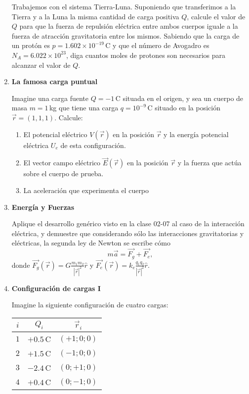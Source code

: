 \documentclass[a4paper,12pt]{article}
\begin{document}
\begin{enumerate}
Trabajemos con el sistema Tierra-Luna. Suponiendo
que transferimos a la Tierra y a la Luna la misma cantidad de carga positiva $Q$,
calcule el valor de $Q$ para que la fuerza de repulsión eléctrica entre ambos
cuerpos iguale a la fuerza de atracción gravitatoria entre los mismos. Sabiendo
que la carga de un protón es $p=1.602\times10^{-19}$\,C y que el número de
Avogadro es $N_A=6.022\times
10^{23}$, diga cuantos moles de protones son necesarios para alcanzar el
valor de $Q$.

\item {\bf{La famosa carga puntual}}

Imagine una carga fuente $Q=-1$\,C situada en el origen, y sea un cuerpo de
masa $m=1$\,kg que tiene una carga $q=10^{-9}$\,C situado en la posición
$\vec{r}=(1,1,1)$. Calcule:
\begin{enumerate}
  \item El potencial eléctrico $V(\vec{r})$  en la posición $\vec{r}$ y la
    energía potencial eléctrica $U_e$ de esta configuración.
  \item El vector campo eléctrico $\vec{E}(\vec{r})$ en la posición $\vec{r}$ y
    la fuerza que actúa sobre el cuerpo de prueba.
  \item La aceleración que experimenta el cuerpo
\end{enumerate}

\item {\bf{Energía y Fuerzas}}

Aplique el desarrollo genérico visto en la clase 02-07 al caso de la interacción eléctrica, y demuestre que considerando sólo las interacciones gravitatorias y eléctricas, la segunda ley de Newton se escribe cómo
\[
  m \vec{a} = \vec{F_g} + \vec{F_e},
\]
donde $\vec{F_g}(\vec r) = G\frac{m_1 m_2}{|\vec{r}|^2} \hat{r}$ y $\vec{F_e}(\vec r) = k_e \frac{ q_1 q_2}{|\vec{r}|^2} \hat{r}$.

\item {\bf{Configuración de cargas I}}

Imagine la siguiente configuración de cuatro cargas:
\begin{center}
\begin{tabular}{ccc}
$i$ & $Q_i$ & $\vec{r}_i$ \\
\hline
$1$ & $+0.5$\,C & $(+1;0;0)$ \\
$2$ & $+1.5$\,C & $(-1;0;0)$ \\
$3$ & $-2.4$\,C & $(0;+1;0)$ \\
$4$ & $+0.4$\,C & $(0;-1;0)$ \\
\hline
\end{tabular}
\end{center}


\end{enumerate}
\end{document}

